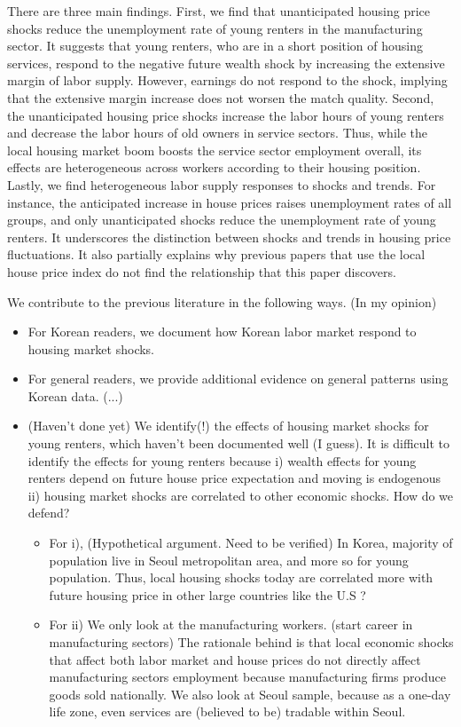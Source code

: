 \documentclass[10pt]{article}
\theoremstyle{definition}
\theoremstyle{remark}
\begin{document}
There are three main findings. First, we find that unanticipated housing price shocks reduce the unemployment rate of young renters in the manufacturing sector. It suggests that young renters, who are in a short position of housing services, respond to the negative future wealth shock by increasing the extensive margin of labor supply. However, earnings do not respond to the shock, implying that the extensive margin increase does not worsen the match quality. Second, the unanticipated housing price shocks increase the labor hours of young renters and decrease the labor hours of old owners in service sectors. Thus, while the local housing market boom boosts the service sector employment overall, its effects are heterogeneous across workers according to their housing position. Lastly, we find heterogeneous labor supply responses to shocks and trends. For instance, the anticipated increase in house prices raises unemployment rates of all groups, and only unanticipated shocks reduce the unemployment rate of young renters. It underscores the distinction between shocks and trends in housing price fluctuations. It also partially explains why previous papers that use the local house price index do not find the relationship that this paper discovers. 

We contribute to the previous literature in the following ways. (In my opinion)
\begin{itemize}
	\item For Korean readers, we document how Korean labor market respond to housing market shocks.
	\item For general readers, we provide additional evidence on general patterns using Korean data. (...)
	\item (Haven't done yet) We identify(!) the effects of housing market shocks for young renters, which haven't been documented well (I guess). It is difficult to identify the effects for young renters because i) wealth effects for young renters depend on future house price expectation and moving is endogenous ii) housing market shocks are correlated to other economic shocks. How do we defend?
	\begin{itemize}
		\item For i), (Hypothetical argument. Need to be verified) In Korea, majority of population live in Seoul metropolitan area, and more so for young population. Thus, local housing shocks today are correlated more with future housing price in other large countries like the U.S ?  
		\item For ii) We only look at the manufacturing workers. (start career in manufacturing sectors) The rationale behind is that local economic shocks that affect both labor market and house prices do not directly affect manufacturing sectors employment because manufacturing firms produce goods sold nationally. We also look at Seoul sample, because as a one-day life zone, even services are (believed to be) tradable within Seoul. 
	\end{itemize}
\end{itemize}
\end{document}
